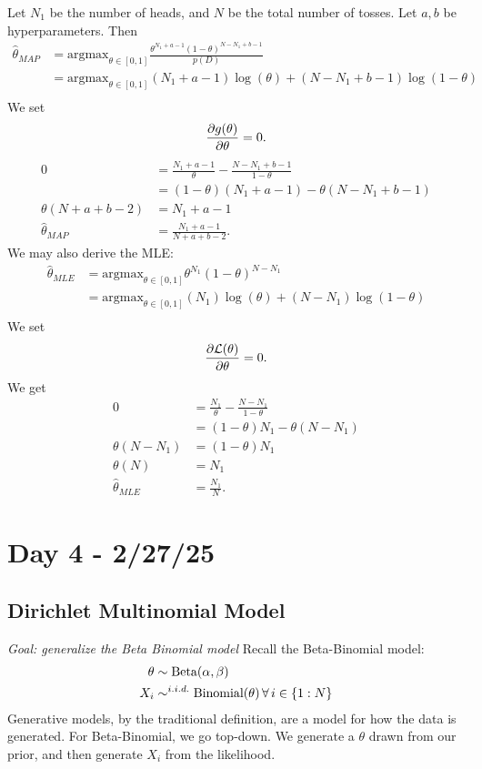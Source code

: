 \documentclass{chaistyle}
\begin{document}
\begin{example*}
    Let \(N_1\) be the number of heads, and \(N\) be the total number of tosses. Let \(a,b\) be hyperparameters. Then \begin{align*}
        \hat\theta_{MAP} &= \text{argmax}_{\theta\in[0,1]}\frac{\theta^{N_1+a-1}(1-\theta)^{N-N_1+b-1}}{p(D)} \\ 
        &= \text{argmax}_{\theta\in[0,1]}(N_1+a-1)\log(\theta)+(N-N_1+b-1)\log(1-\theta) \\ 
    \end{align*}
    We set \[\frac{\partial g(\theta)}{\partial \theta}=0.\]
    \begin{align*}
        0 &= \frac{N_1+a-1}{\theta}-\frac{N-N_1+b-1}{1-\theta} \\
        &= (1-\theta)(N_1+a-1)-\theta(N-N_1+b-1) \\
        \theta(N+a+b-2) &= N_1+a-1 \\ 
        \hat\theta_{MAP} &= \frac{N_1+a-1}{N+a+b-2}.
    \end{align*}
    We may also derive the MLE: \begin{align*}
        \hat\theta_{MLE} &= \text{argmax}_{\theta\in[0,1]}\theta^{N_1}(1-\theta)^{N-N_1} \\
        &= \text{argmax}_{\theta\in[0,1]}(N_1)\log(\theta)+(N-N_1)\log(1-\theta) \\
    \end{align*}
    We set \[\frac{\partial \mathcal{L}(\theta)}{\partial \theta}=0.\] We get \begin{align*}
        0 &= \frac{N_1}{\theta}-\frac{N-N_1}{1-\theta} \\
        &= (1-\theta)N_1-\theta(N-N_1) \\
        \theta(N-N_1) &= (1-\theta)N_1\ \\
        \theta(N) &= N_1 \\
        \hat\theta_{MLE} &= \frac{N_1}{N}.
    \end{align*}
\end{example*}
\section*{Day 4 - 2/27/25}
\subsection*{Dirichlet Multinomial Model}
\emph{Goal: generalize the Beta Binomial model}
Recall the Beta-Binomial model: \begin{align*}
    \theta&\sim\text{Beta}(\alpha,\beta) \\
    X_i&\sim^{i.i.d.}\text{Binomial}(\theta) \,\forall\, i\in\{1:N\}\\
\end{align*}
Generative models, by the traditional definition, are a model for how the data is generated. For Beta-Binomial, we go top-down. We generate a \(\theta\) drawn from our prior, and then generate \(X_i\) from the likelihood.
\end{document}
